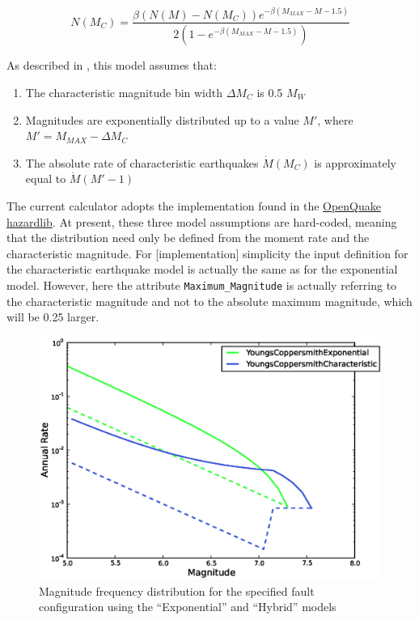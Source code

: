\begin{equation}
N \left( {M_C} \right) = \frac{\beta \left( {N \left( M \right) - N \left( {M_C} \right)} \right) e^{-\beta \left( {M_{MAX} - M - 1.5} \right)}}{2 \left( {1 - e^{-\beta \left( {M_{MAX} - M - 1.5} \right)}} \right)}
\end{equation}

As described in \textcite{YoungsCoppersmith1985}, this model assumes that:
\begin{enumerate}
\item The characteristic magnitude bin width $\Delta M_C$ is 0.5 $M_W$
\item Magnitudes are exponentially distributed up to a value $M'$, where $M' = M_{MAX} - \Delta M_C$
\item The absolute rate of characteristic earthquakes $\dot{M} \left( {M_C} \right)$ is approximately equal to $\dot{M} \left( {M' - 1} \right)$
\end{enumerate}

The current calculator adopts the implementation found in the \href{http://docs.openquake.org/oq-hazardlib/mfd.html#module-openquake.hazardlib.mfd.youngs_coppersmith_1985}{OpenQuake hazardlib}. At present, these three model assumptions are hard-coded, meaning that the distribution need only be defined from the moment rate and the characteristic magnitude. For [implementation] simplicity the input definition for the characteristic earthquake model is actually the same as for the exponential model. However, here the attribute \verb=Maximum_Magnitude= is actually referring to the characteristic magnitude and not to the absolute maximum magnitude, which will be 0.25 larger. 

\begin{figure}[htb]
  \centering
      \includegraphics[trim=5mm 5mm 5mm 5mm, clip, width=12cm]{./figures/youngs_coppersmith_mfds.eps}
  \caption{Magnitude frequency distribution for the specified fault configuration using the \textcite{YoungsCoppersmith1985} ``Exponential'' and ``Hybrid'' models}
  \label{fig:youngs_coppersmith}
\end{figure}

